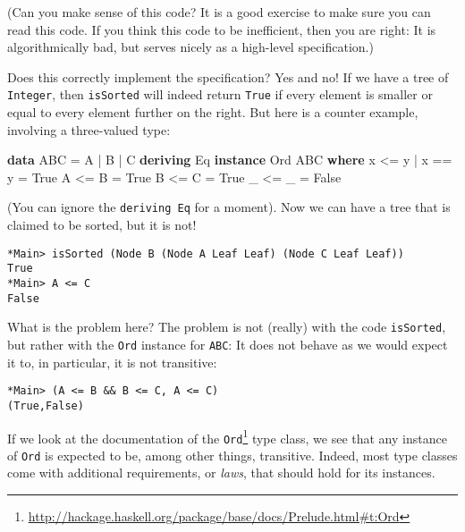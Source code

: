 \documentclass[11pt,
  american,
  DIV13]{article}
\newenvironment{Shaded}{}{}
\newcommand{\DataTypeTok}[1]{\textcolor[rgb]{0.56,0.13,0.00}{#1}}
\newcommand{\KeywordTok}[1]{\textcolor[rgb]{0.00,0.44,0.13}{\textbf{#1}}}
\newcommand{\NormalTok}[1]{#1}
\newcommand{\OperatorTok}[1]{\textcolor[rgb]{0.40,0.40,0.40}{#1}}
\newcommand{\OtherTok}[1]{\textcolor[rgb]{0.00,0.44,0.13}{#1}}
\DeclareRobustCommand{\href}[2]{#2\footnote{\url{#1}}}
\begin{document}
(Can you make sense of this code? It is a good exercise to make sure you
can read this code. If you think this code to be inefficient, then you
are right: It is algorithmically bad, but serves nicely as a high-level
specification.)

Does this correctly implement the specification? Yes and no! If we have
a tree of \texttt{Integer}, then \texttt{isSorted} will indeed return
\texttt{True} if every element is smaller or equal to every element
further on the right. But here is a counter example, involving a
three-valued type:

\begin{Shaded}
\begin{Highlighting}[]
\KeywordTok{data} \DataTypeTok{ABC} \OtherTok{=} \DataTypeTok{A} \OperatorTok{|} \DataTypeTok{B} \OperatorTok{|} \DataTypeTok{C} \KeywordTok{deriving} \DataTypeTok{Eq}
\KeywordTok{instance} \DataTypeTok{Ord} \DataTypeTok{ABC} \KeywordTok{where}
\NormalTok{  x }\OperatorTok{\textless{}=}\NormalTok{ y }\OperatorTok{|}\NormalTok{ x }\OperatorTok{==}\NormalTok{ y }\OtherTok{=} \DataTypeTok{True}
  \DataTypeTok{A} \OperatorTok{\textless{}=} \DataTypeTok{B} \OtherTok{=} \DataTypeTok{True}
  \DataTypeTok{B} \OperatorTok{\textless{}=} \DataTypeTok{C} \OtherTok{=} \DataTypeTok{True}
\NormalTok{  \_ }\OperatorTok{\textless{}=}\NormalTok{ \_ }\OtherTok{=} \DataTypeTok{False}
\end{Highlighting}
\end{Shaded}

(You can ignore the \texttt{deriving\ Eq} for a moment). Now we can have
a tree that is claimed to be sorted, but it is not!

\begin{verbatim}
*Main> isSorted (Node B (Node A Leaf Leaf) (Node C Leaf Leaf))
True
*Main> A <= C
False
\end{verbatim}

What is the problem here? The problem is not (really) with the code
\texttt{isSorted}, but rather with the \texttt{Ord} instance for
\texttt{ABC}: It does not behave as we would expect it to, in
particular, it is not transitive:

\begin{verbatim}
*Main> (A <= B && B <= C, A <= C)
(True,False)
\end{verbatim}

If we look at the
\href{http://hackage.haskell.org/package/base/docs/Prelude.html\#t:Ord}{documentation
of the \texttt{Ord}} type class, we see that any instance of
\texttt{Ord} is expected to be, among other things, transitive. Indeed,
most type classes come with additional requirements, or \emph{laws},
that should hold for its instances.
\end{document}
